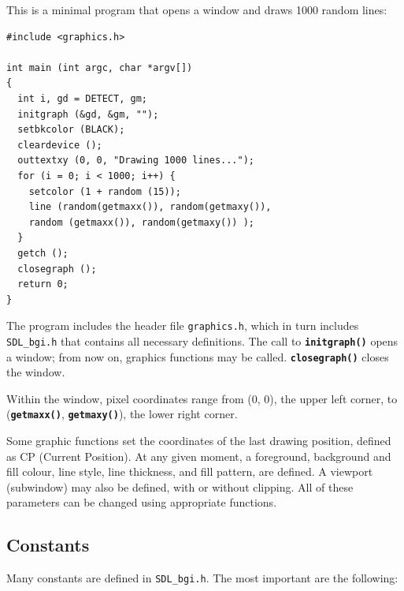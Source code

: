 \documentclass[a4paper,12pt]{article}
\newcommand{\func}[1]{\textbf{\texttt{#1}}}  %
\newcommand{\F}[1]{\texttt{#1}}     %
\begin{document}
This is a minimal program that opens a window and draws 1000 random
lines:

\begin{small}
\begin{spacing}{0.9}
\begin{verbatim}
#include <graphics.h>

int main (int argc, char *argv[])
{
  int i, gd = DETECT, gm;
  initgraph (&gd, &gm, "");
  setbkcolor (BLACK);
  cleardevice ();
  outtextxy (0, 0, "Drawing 1000 lines...");
  for (i = 0; i < 1000; i++) {
    setcolor (1 + random (15));
    line (random(getmaxx()), random(getmaxy()),
    random (getmaxx()), random(getmaxy()) );
  }
  getch ();
  closegraph ();
  return 0;
}
\end{verbatim}
\end{spacing}
\end{small}

The program includes the header file \F{graphics.h}, which in turn
includes \F{SDL\_bgi.h} that contains all necessary definitions. The
call to \func{initgraph()} opens a window; from now on, graphics
functions may be called. \func{closegraph()} closes the window.

Within the window, pixel coordinates range from (0, 0), the upper left
corner, to (\func{get\-maxx()}, \func{getmaxy()}), the lower right
corner.

Some graphic functions set the coordinates of the last drawing
position, defined as CP (Current Position). At any given moment, a
foreground, background and fill colour, line style, line thickness,
and fill pattern, are defined. A viewport (subwindow) may also be
defined, with or without clipping. All of these parameters can be
changed using appropriate functions.


\subsection{Constants}

Many constants are defined in \F{SDL\_bgi.h}. The most important are
the following:
\end{document}
